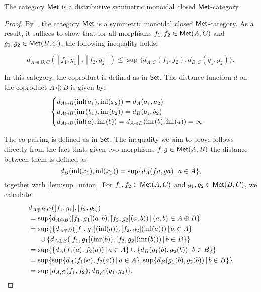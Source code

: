 \begin{proposition}
        \label{prop:vcat}
        The category $\mathsf{Met}$ is a distributive symmetric monoidal closed $\mathsf{Met}$-category 
\end{proposition}

\begin{proof}
  By~\cite[Example 3.8]{dahlqvist2022syntactic}, the category $\mathsf{Met}$ is a symmetric monoidal closed $\mathsf{Met}$-category. As a result, it suffices to show that for all morphisms \( f_1, f_2 \in \mathsf{Met}(A, C) \) and \( g_1, g_2 \in \mathsf{Met}(B, C) \), the following inequality holds:
  
\[
  d_{A \oplus B, C}([f_1, g_1], [f_2, g_2]) \leq \sup \{d_{A,C}(f_1, f_2), d_{B,C}(g_1, g_2)\}.
\]

In this category, the coproduct is defined as in $\mathsf{Set}$. The distance function $d$ on the coproduct $A \oplus B$ is given by:
   \[
    \begin{cases}
    d_{A \oplus B}(\mathrm{inl}(a_1),\mathrm{inl}(x_2)) = d_A(a_1,a_2) \\
    d_{A \oplus B}(\mathrm{inr}(b_1),\mathrm{inr}(b_2)) = d_B(b_1,b_2) \\
    d_{A \oplus B}(\mathrm{inl}(a), \mathrm{inr}(b)) = 
    d_{A \oplus B}(\mathrm{inr}(b), \mathrm{inl}(a))  = \infty
    \end{cases}
    \]

    The co-pairing is defined as in $\mathsf{Set}$. The inequality we aim to prove follows directly from the fact that, given two morphisms  $f,g\in \mathsf{Met}(A, B)$ the distance between them is defined as 
  $$ d_{B}(\mathrm{inl}(x_1),\mathrm{inl}(x_2)) = \sup \{ d_A (f a, g a) \,\vert \, a \in A \} ,$$  
    together with \autoref{lem:sup_union}. For  \( f_1, f_2 \in \mathsf{Met}(A, C) \) and \( g_1, g_2 \in \mathsf{Met}(B, C) \), we calculate:
    \begin{align*}
      & d_{A \oplus B, C}([f_1, g_1], [f_2, g_2]) \\
      &  =  \sup \{ d_{A\oplus B} ([f_1, g_1] (a,b), [f_2, g_2] (a,b)) \,\vert \, (a,b) \in A \oplus B \} \\
      & =  \sup \{ \{ d_{A\oplus B} ([f_1, g_1] (\mathrm{inl}(a)), [f_2, g_2] (\mathrm{inl}(a))) \,\vert \, a \in A \}    \\
      & \hspace{15pt} \cup \{d_{A\oplus B} ([f_1, g_1] (\mathrm{inr}(b)), [f_2, g_2] (\mathrm{inr}(b))) \,\vert \, b \in B\}\} \\
      & = \sup \{ \{ d_{A}(f_1 (a), f_2 (a)) \,\vert \, a \in A \} \cup  \{d_{B}(g_1 (b), g_2 (b)) \,\vert \, b \in B \}\} \\
      & = \sup   \{ \sup \{ d_{A}(f_1 (a), f_2 (a)) \,\vert \, a \in A \}, \sup\{d_{B}(g_1 (b), g_2 (b)) \,\vert \, b \in B \}\} \\
      &=  \sup \{d_{A,C}(f_1, f_2), d_{B,C}(g_1, g_2)\}. 
    \end{align*}
\end{proof}

